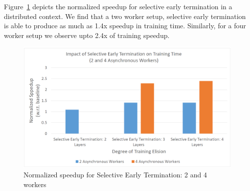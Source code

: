 Figure~\ref{fig:fig10} depicts the normalized speedup for selective early termination in a distributed context. We find that a two worker setup, selective early termination is able to produce as much as 1.4x speedup in training time. Similarly, for a four worker setup we observe upto 2.4x of training speedup.

\begin{figure}[t]
	\centering
	\includegraphics[width=1.0\columnwidth]{figures/fig10.PNG}
	\caption{Normalized speedup for Selective Early Termination: 2 and 4 workers}
	\label{fig:fig10}
\end{figure}

